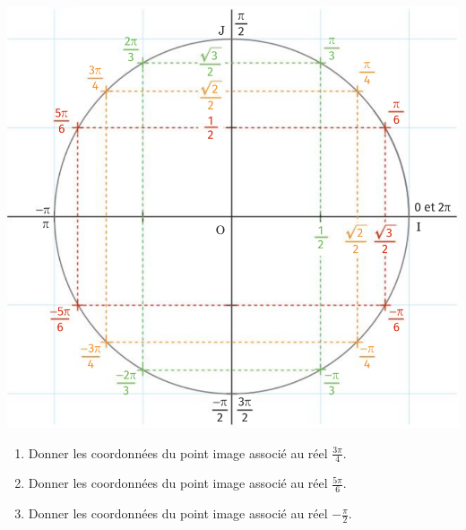 \documentclass[11pt]{article}
\begin{document}
\begin{minipage}{.7\textwidth}
\begin{center}
\includegraphics[scale=.35]{valeurs.png}
\end{center}
\end{minipage}
\begin{app}
  \begin{enumerate}
    \item Donner les coordonnées du point image associé au réel
      $\frac{3\pi}{4}$.
    \item Donner les coordonnées du point image associé au réel
      $\frac{5\pi}{6}$.
    \item Donner les coordonnées du point image associé au réel
      $-\frac{\pi}{2}$.
  \end{enumerate}
\end{app}
\end{document}
